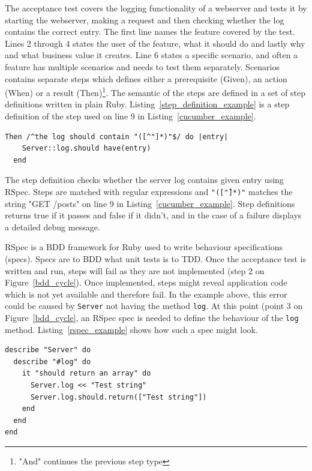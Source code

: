 The acceptance test covers the logging functionality of a webserver and tests it
by starting the webserver, making a request and then checking whether the log
contains the correct entry.  The first line names the feature covered by the
test. Lines 2 through 4 states the user of the feature, what it should do and
lastly why and what business value it creates. Line 6 states a specific
scenario, and often a feature has multiple scenarios and needs to test them
separately. Scenarios contains separate steps which defines either a
prerequisite (Given), an action (When) or a result (Then)\footnote{"And"
continues the previous step type}. The semantic of the steps are defined in a
set of step definitions written in plain Ruby.
Listing~\ref{step_definition_example} is a step definition of the step used on
line 9 in Listing~\ref{cucumber_example}.

\bigskip
\begin{lstlisting}[label=step_definition_example,caption=Cucumber step definition]
  Then /^the log should contain "([^"]*)"$/ do |entry|
    Server::log.should have(entry)
  end
\end{lstlisting}

The step definition checks whether the server log contains given entry using
RSpec. Steps are matched with regular expressions and \texttt{"([\^"]*)"}
matches the string "GET /posts" on line 9 in Listing~\ref{cucumber_example}.
Step definitions returns true if it passes and false if it didn't, and in the
case of a failure displays a detailed debug message.

RSpec is a BDD framework for Ruby used to write behaviour specifications
(specs). Specs are to BDD what unit tests is to TDD. Once the acceptance test is
written and run, steps will fail as they are not implemented (step 2 on
Figure~\ref{bdd_cycle}). Once implemented, steps might reveal application code
which is not yet available and therefore fail. In the example above, this error
could be caused by \texttt{Server} not having the method \texttt{log}. At this
point (point 3 on Figure~\ref{bdd_cycle}, an RSpec spec is needed to define the
behaviour of the \texttt{log} method. Listing~\ref{rspec_example} shows how such
a spec might look.

\bigskip
\begin{lstlisting}[label=rspec_example,caption=RSpec (spec) example]
describe "Server" do
  describe "#log" do
    it "should return an array" do
      Server.log << "Test string"
      Server.log.should.return(["Test string"])
    end
  end
end
\end{lstlisting}


